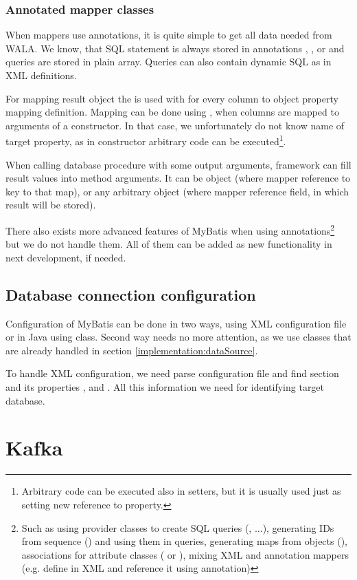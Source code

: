 \subsubsection{Annotated mapper classes}

When mappers use annotations, it is quite simple to get all data needed
from WALA. We know, that SQL statement is always stored in annotations
, ,  or 
and queries are stored in plain  array.
Queries can also contain dynamic SQL as in XML definitions.

For mapping result object the  is used with 
for every column to object property mapping definition.
Mapping can be done using , when columns are mapped
to arguments of a constructor. In that case, we unfortunately do not know
name of target property, as in constructor arbitrary code can be executed\footnote{
  Arbitrary code can be executed also in setters, but it is usually used
  just as setting new reference to property.
}.

When calling database procedure with some output arguments,
framework can fill result values into method arguments.
It can be  object (where mapper reference to key to that map),
or any arbitrary object (where mapper reference field, in which result will be stored).

There also exists more advanced features of MyBatis when using annotations\footnote{
  Such as using provider classes to create SQL queries (, $\ldots$),
  generating IDs from sequence () and using them in queries,
  generating maps from objects (),
  associations for attribute classes ( or ),
  mixing XML and annotation mappers (e.g. define  in XML and reference it
  using  annotation)}
but we do not handle them. All of them can be added as new functionality in next development,
if needed.




\subsection{Database connection configuration}

Configuration of MyBatis can be done in two ways, using XML configuration file
or in Java using  class. Second way needs no more attention,
as we use  classes that are already handled in section \ref{implementation:dataSource}.

To handle XML configuration, we need parse configuration file and find 
section and its properties ,  and . All this
information we need for identifying target database.



\section{Kafka}


